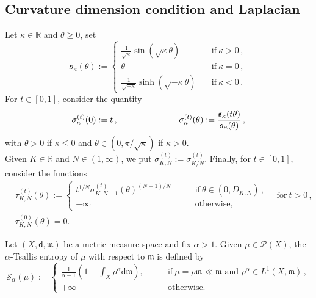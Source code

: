 \documentclass[12pt]{article}
\newcommand{\R}{\mathbb{R}}
\newcommand{\dd}{\mathrm{d}}
\newcommand{\mm}{\mathfrak m}
\newcommand{\sfd}{\mathsf d}
\theoremstyle{plain}
\theoremstyle{definition}
\begin{document}
\subsection{Curvature dimension condition and Laplacian}

Let $\kappa\in \R$ and $\theta\geqslant 0$,  set
\begin{equation}\label{eq: sine func curv}
\mathfrak{s}_\kappa(\theta):=\begin{cases}
\frac{1}{\sqrt{\kappa}}\sin(\sqrt{\kappa}\theta) \quad &\textrm{if} \ \kappa>0\,,\\
\theta \quad &\textrm{if} \ \kappa=0\,,\\
\frac{1}{\sqrt{-\kappa}}\sinh(\sqrt{-\kappa}\theta) \quad &\textrm{if} \ \kappa<0\,.
\end{cases}
\end{equation}
For $t\in[0,1]$, consider the quantity
\begin{equation}\label{eq: sigma func curv}
\sigma_{\kappa}^{(t)}(0):=t\,,\hspace{2.5cm} \sigma_{\kappa}^{(t)}(\theta):=\frac{\mathfrak{s}_\kappa(t\theta)}{\mathfrak{s}_\kappa(\theta)} \,,
\end{equation}
with $\theta>0$ if $\kappa\leqslant 0$ and $\theta\in (0,\pi/\sqrt{\kappa})$ if $\kappa>0$. 
\\Given $K\in \mathbb{R}$ and $N\in (1,\infty)$, we put $\sigma_{K,N}^{(t)}:=\sigma_{K/N}^{(t)}$. Finally, for $t\in [0,1]$, consider the functions
\begin{align*}\label{eq: tau func curv}
&\tau_{K,N}^{(t)}(\theta):=\begin{cases}t^{1/N}\sigma_{K,N-1}^{(t)}(\theta)^{(N-1)/N} \qquad &\textrm{if} \ \theta\in (0,D_{K,N})\,,\\
+\infty &\textrm{otherwise},
\end{cases} \quad \textrm{for}\ t>0\,,\\
&\tau_{K,N}^{(0)}(\theta)=0.
\end{align*}

Let $(X,\sfd, \mm)$ be a metric measure space and fix $\alpha>1$. Given $\mu\in \mathcal{P}(X)$,  the $\alpha$-Tsallis entropy of $\mu$ with respect to $\mm$ is defined by
\begin{equation}
\mathcal{S}_\alpha(\mu):=
\begin{cases}
\frac{1}{\alpha-1}\left(1-\int_X \rho^{\alpha}\dd\mm\right), \qquad &\text{if} \ \mu=\rho\mm\ll \mm \text{ and } \rho^\alpha\in L^1(X,\mm)\,,  \\
+\infty \qquad &\textrm{otherwise.}
\end{cases}
\end{equation}
\end{document}
